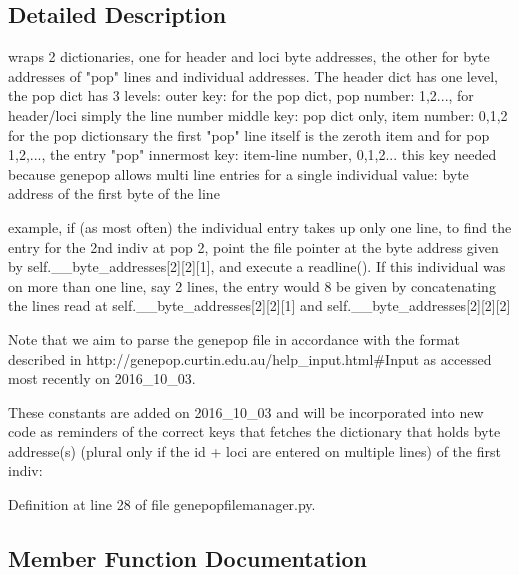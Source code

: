 \subsection{Detailed Description}
\begin{DoxyVerb}wraps 2 dictionaries, one for header and loci byte addresses, the other for 
        byte addresses of "pop" lines and individual addresses.  The header dict 
        has one level, the pop dict  has 3 levels:
        outer key: for the pop dict, pop number: 1,2..., for header/loci simply the line number
        middle key: pop dict only,   item number: 0,1,2
            for the pop dictionsary the first "pop" line itself is the zeroth item
            and for pop 1,2,..., the entry "pop"
        innermost key:  item-line number, 0,1,2...
            this key needed because genepop allows multi line entries for
            a single individual
    value: byte address of the first byte of the line

    example, if (as most often) the individual entry takes up only one line, 
    to find the entry for the 2nd indiv at pop 2, point the file pointer at 
    the byte address given by self.__byte_addresses[2][2][1], and execute a readline().  
    If this individual was on more than one line, say 2 lines, the entry would 8
    be given by concatenating the lines read at self.__byte_addresses[2][2][1] 
    and self.__byte_addresses[2][2][2]

    Note that we aim to parse the genepop file in accordance with the format described
    in http://genepop.curtin.edu.au/help_input.html#Input as accessed most recently
    on 2016_10_03.
\end{DoxyVerb}
\begin{DoxyVerb}These constants are added on 2016_10_03
and will be incorporated into new code
as reminders of the correct keys that
fetches the dictionary that holds byte addresse(s) 
(plural only if the id + loci are entered
on multiple lines) of the first indiv:
\end{DoxyVerb}
 

Definition at line 28 of file genepopfilemanager.\+py.



\subsection{Member Function Documentation}
